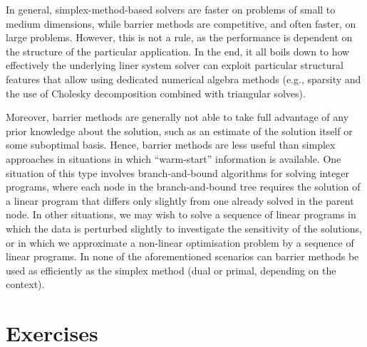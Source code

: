 In general, simplex-method-based solvers are faster on problems of small to medium dimensions, while barrier methods are competitive, and often faster, on large problems. However, this is not a rule, as the performance is dependent on the structure of the particular application. In the end, it all boils down to how effectively the underlying liner system solver can exploit particular structural features that allow using dedicated numerical algebra methods (e.g., sparsity and the use of Cholesky decomposition combined with triangular solves).

Moreover, barrier methods are generally not able to take full advantage of any prior knowledge about the solution, such as an estimate of the solution itself or some suboptimal basis. Hence, barrier methods are less useful than simplex approaches in situations in which ``warm-start'' information is available. One situation of this type involves branch-and-bound algorithms for solving integer programs, where each node in the branch-and-bound tree requires the solution of a linear program that differs only slightly from one already solved in the parent node. In other situations, we may wish to solve a sequence of linear programs in which the data is perturbed slightly to investigate the sensitivity of the solutions, or in which we approximate a non-linear optimisation problem by a sequence of linear programs. In none of the aforementioned scenarios can barrier methods be used as efficiently as the simplex method (dual or primal, depending on the context).

\vfill
\pagebreak	

\section{Exercises}


